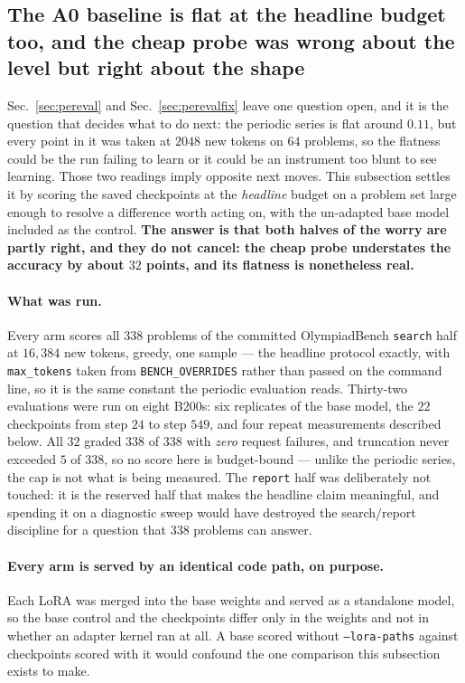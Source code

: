 \subsection{The A0 baseline is flat at the headline budget too, and the cheap probe was
wrong about the level but right about the shape}
\label{sec:a0headline}

Sec.~\ref{sec:pereval} and Sec.~\ref{sec:perevalfix} leave one question open, and it is the
question that decides what to do next: the periodic series is flat around $0.11$, but every
point in it was taken at $2048$ new tokens on $64$ problems, so the flatness could be the run
failing to learn or it could be an instrument too blunt to see learning. Those two readings
imply opposite next moves. This subsection settles it by scoring the saved checkpoints at the
\emph{headline} budget on a problem set large enough to resolve a difference worth acting on,
with the un-adapted base model included as the control. \textbf{The answer is that both halves
of the worry are partly right, and they do not cancel: the cheap probe understates the
accuracy by about $32$ points, and its flatness is nonetheless real.}

\paragraph{What was run.} Every arm scores all $338$ problems of the committed OlympiadBench
\texttt{search} half at $16{,}384$ new tokens, greedy, one sample --- the headline protocol
exactly, with \texttt{max\_tokens} taken from \texttt{BENCH\_OVERRIDES} rather than passed on
the command line, so it is the same constant the periodic evaluation reads. Thirty-two
evaluations were run on eight B200s: six replicates of the base model, the $22$ checkpoints
from step $24$ to step $549$, and four repeat measurements described below. All $32$ graded
$338$ of $338$ with \emph{zero} request failures, and truncation never exceeded $5$ of $338$,
so no score here is budget-bound --- unlike the periodic series, the cap is not what is being
measured. The \texttt{report} half was deliberately not touched: it is the reserved half that
makes the headline claim meaningful, and spending it on a diagnostic sweep would have
destroyed the search/report discipline for a question that $338$ problems can answer.

\paragraph{Every arm is served by an identical code path, on purpose.} Each LoRA was merged
into the base weights and served as a standalone model, so the base control and the
checkpoints differ only in the weights and not in whether an adapter kernel ran at all. A
base scored without \texttt{--lora-paths} against checkpoints scored with it would confound
the one comparison this subsection exists to make.

